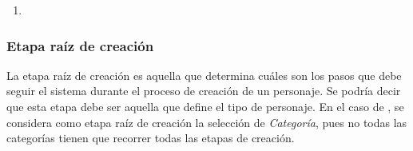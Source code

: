 \begin{enumerate}
    \item 
\end{enumerate}

\subsubsection{Etapa raíz de creación}
La etapa raíz de creación es aquella que determina cuáles son los pasos que debe seguir el sistema durante el proceso 
de creación de un personaje. Se podría decir que esta etapa debe ser aquella que define el tipo de personaje. En el 
caso de \anima, se considera como etapa raíz de creación la selección de \textit{Categoría}, pues no todas las categorías 
tienen que recorrer todas las etapas de creación. \medskip
